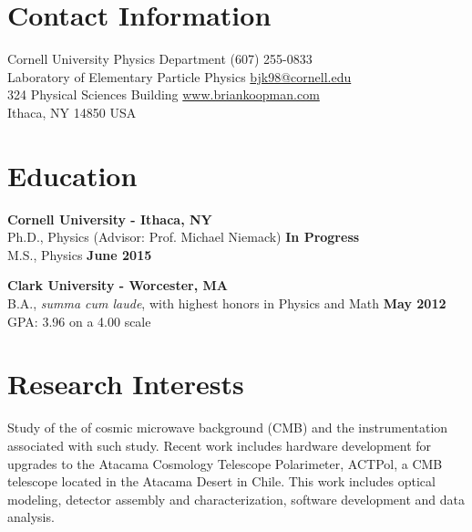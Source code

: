 \documentclass[margin,line]{res}
\begin{document}
  

\newcommand{\myname}{Brian Koopman}
\newlength{\mynamewidth}
\settowidth{\mynamewidth}{\namefont\myname}

\name{\hspace*{0.5\textwidth}\hspace{-0.5\mynamewidth} \myname \vspace*{.1in}}
\thispagestyle{empty}

\begin{resume}                        

\section{\sc Contact Information}
Cornell University Physics Department \hfill (607) 255-0833\\
Laboratory of Elementary Particle Physics \hfill \href{mailto:bjk98@cornell.edu}{bjk98@cornell.edu}\\
324 Physical Sciences Building \hfill \href{http://www.briankoopman.com}{www.briankoopman.com}\\
Ithaca, NY 14850 USA
 
\section{\sc Education}
\textbf{Cornell University - Ithaca, NY}\\
    Ph.D., Physics (Advisor: Prof. Michael Niemack) \hfill \textbf{In Progress}\\
    M.S., Physics \hfill \textbf{June 2015}

\textbf{Clark University - Worcester, MA}\\
    B.A., \textit{summa cum laude}, with highest honors in Physics and Math \hfill \textbf{May 2012}\\
    GPA: 3.96 on a 4.00 scale

\section{\sc Research Interests}
Study of the of cosmic microwave background (CMB) and the instrumentation
associated with such study. Recent work includes hardware development for
upgrades to the Atacama Cosmology Telescope Polarimeter, ACTPol, a CMB
telescope located in the Atacama Desert in Chile. This work includes optical
modeling, detector assembly and characterization, software development and data
analysis.


\end{resume}
\end{document}
